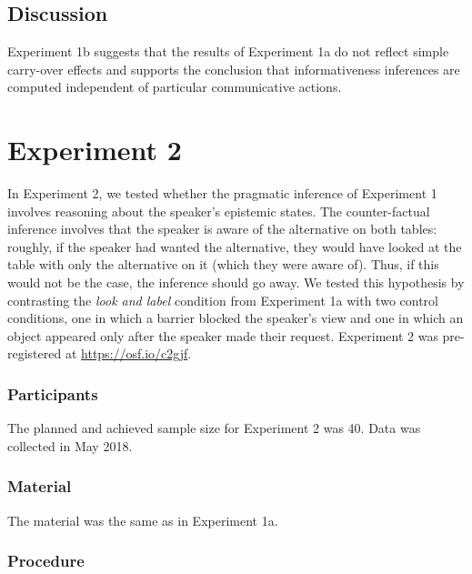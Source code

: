 \documentclass[
  man,floatsintext]{apa6}
\begin{document}
\subsection{Discussion}\label{discussion-1}

Experiment 1b suggests that the results of Experiment 1a do not reflect simple carry-over effects and supports the conclusion that informativeness inferences are computed independent of particular communicative actions.

\section{Experiment 2}\label{experiment-2}

In Experiment 2, we tested whether the pragmatic inference of Experiment 1 involves reasoning about the speaker's epistemic states. The counter-factual inference involves that the speaker is aware of the alternative on both tables: roughly, if the speaker had wanted the alternative, they would have looked at the table with only the alternative on it (which they were aware of). Thus, if this would not be the case, the inference should go away. We tested this hypothesis by contrasting the \emph{look and label} condition from Experiment 1a with two control conditions, one in which a barrier blocked the speaker's view and one in which an object appeared only after the speaker made their request. Experiment 2 was pre-registered at \url{https://osf.io/c2gjf}.

\subsubsection{Participants}\label{participants-2}

The planned and achieved sample size for Experiment 2 was 40. Data was collected in May 2018.

\subsubsection{Material}\label{material-2}

The material was the same as in Experiment 1a.

\subsubsection{Procedure}\label{procedure-2}
\end{document}
